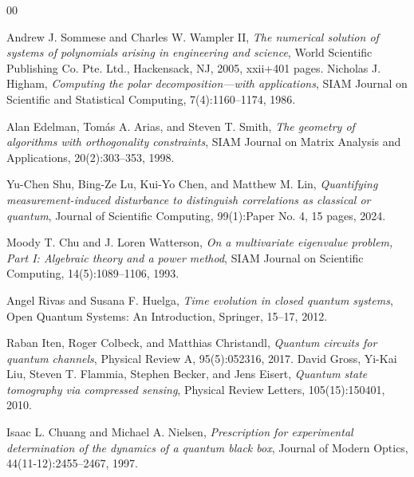 \documentclass[sn-mathphys-num]{sn-jnl}%
\theoremstyle{thmstyleone}%
\theoremstyle{thmstyletwo}%
\theoremstyle{thmstylethree}%
\begin{document}
\begin{thebibliography}{00}

  Andrew J. Sommese and Charles W. Wampler II,
  \textit{The numerical solution of systems of polynomials arising in engineering and science},
  World Scientific Publishing Co. Pte. Ltd., Hackensack, NJ, 2005, xxii+401 pages.
  Nicholas J. Higham,
  \textit{Computing the polar decomposition---with applications},
  SIAM Journal on Scientific and Statistical Computing, 7(4):1160--1174, 1986.

  Alan Edelman, Tomás A. Arias, and Steven T. Smith,
  \textit{The geometry of algorithms with orthogonality constraints},
  SIAM Journal on Matrix Analysis and Applications, 20(2):303--353, 1998.

  Yu-Chen Shu, Bing-Ze Lu, Kui-Yo Chen, and Matthew M. Lin,
  \textit{Quantifying measurement-induced disturbance to distinguish correlations as classical or quantum},
  Journal of Scientific Computing, 99(1):Paper No. 4, 15 pages, 2024.

  Moody T. Chu and J. Loren Watterson,
  \textit{On a multivariate eigenvalue problem, Part I: Algebraic theory and a power method},
  SIAM Journal on Scientific Computing, 14(5):1089--1106, 1993.

  Angel Rivas and Susana F. Huelga,
  \textit{Time evolution in closed quantum systems},
  Open Quantum Systems: An Introduction, Springer, 15--17, 2012.

  Raban Iten, Roger Colbeck, and Matthias Christandl,
  \textit{Quantum circuits for quantum channels},
  Physical Review A, 95(5):052316, 2017.
  David Gross, Yi-Kai Liu, Steven T. Flammia, Stephen Becker, and Jens Eisert,
  \textit{Quantum state tomography via compressed sensing},
  Physical Review Letters, 105(15):150401, 2010.

  Isaac L. Chuang and Michael A. Nielsen,
  \textit{Prescription for experimental determination of the dynamics of a quantum black box},
  Journal of Modern Optics, 44(11-12):2455--2467, 1997.


\end{thebibliography}
\end{document}
